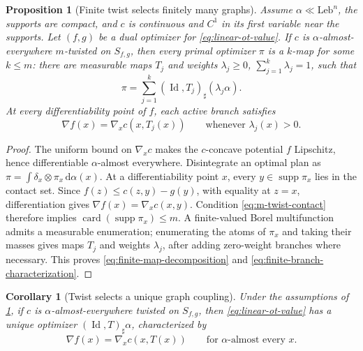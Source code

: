 \documentclass[11pt,a4paper]{article}
\newtheorem{proposition}[theorem]{Proposition}
\newtheorem{corollary}[theorem]{Corollary}
\theoremstyle{definition}
\theoremstyle{remark}
\newcommand{\Id}{\operatorname{Id}}
\newcommand{\supp}{\operatorname{supp}}
\newcommand{\card}{\operatorname{card}}
\newcommand{\dd}{\,\mathrm d}
\begin{document}
\begin{proposition}[Finite twist selects finitely many graphs]
\label{prop:finite-twist-linear-ot}
Assume \(\alpha\ll\mathrm{Leb}^n\), the supports are compact, and \(c\) is
continuous and \(C^1\) in its first variable near the supports.  Let
\((f,g)\) be a dual optimizer for \eqref{eq:linear-ot-value}.  If \(c\) is
\(\alpha\)-almost-everywhere \(m\)-twisted on \(S_{f,g}\), then every primal
optimizer \(\pi\) is a \(k\)-map for some \(k\leq m\): there are measurable
maps \(T_j\) and weights \(\lambda_j\geq0\),
\(\sum_{j=1}^k\lambda_j=1\), such that
\begin{equation}
  \pi=\sum_{j=1}^k(\Id,T_j)_\sharp(\lambda_j\alpha).
  \label{eq:finite-map-decomposition}
\end{equation}
At every differentiability point of \(f\), each active branch satisfies
\begin{equation}
  \nabla f(x)=\nabla_xc(x,T_j(x))
  \qquad\text{whenever }\lambda_j(x)>0.
  \label{eq:finite-branch-characterization}
\end{equation}
\end{proposition}

\begin{proof}
The uniform bound on \(\nabla_xc\) makes the \(c\)-concave potential \(f\)
Lipschitz, hence differentiable \(\alpha\)-almost everywhere.  Disintegrate
an optimal plan as \(\pi=\int\delta_x\otimes\pi_x\dd\alpha(x)\).  At a
differentiability point \(x\), every \(y\in\supp\pi_x\) lies in the contact
set.  Since \(f(z)\leq c(z,y)-g(y)\), with equality at \(z=x\), differentiation
gives
\(
 \nabla f(x)=\nabla_xc(x,y).
\)
Condition \eqref{eq:m-twist-contact} therefore implies
\(\card(\supp\pi_x)\leq m\).  A finite-valued Borel multifunction admits a
measurable enumeration; enumerating the atoms of \(\pi_x\) and taking their
masses gives maps \(T_j\) and weights \(\lambda_j\), after adding zero-weight
branches where necessary.  This proves \eqref{eq:finite-map-decomposition}
and \eqref{eq:finite-branch-characterization}.
\end{proof}

\begin{corollary}[Twist selects a unique graph coupling]
\label{prop:twist-linear-ot}
Under the assumptions of \cref{prop:finite-twist-linear-ot}, if \(c\) is
\(\alpha\)-almost-everywhere twisted on \(S_{f,g}\), then
\eqref{eq:linear-ot-value} has a unique optimizer
\((\Id,T)_\sharp\alpha\), characterized by
\begin{equation}
  \nabla f(x)=\nabla_xc(x,T(x))
  \qquad\text{for \(\alpha\)-almost every }x.
  \label{eq:generalized-brenier-characterization}
\end{equation}
\end{corollary}
\end{document}
